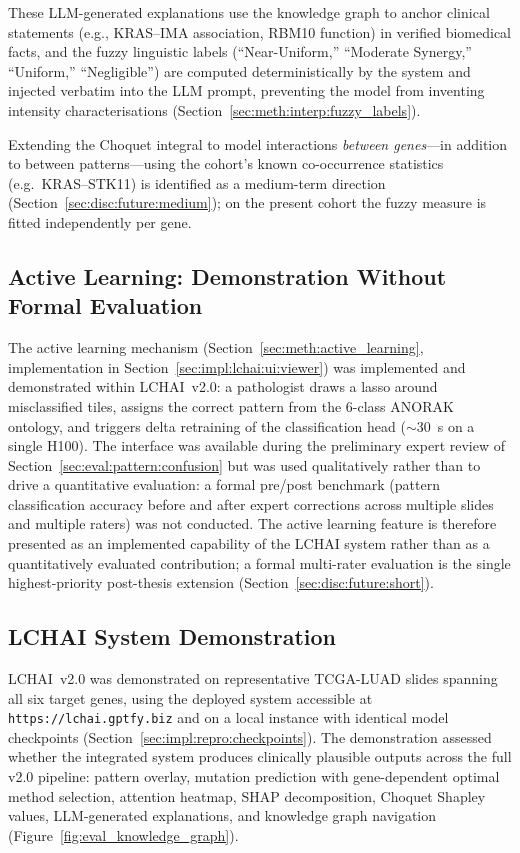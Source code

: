 These LLM-generated explanations use the knowledge graph to anchor
clinical statements (e.g., KRAS--IMA association, RBM10 function)
in verified biomedical facts, and the fuzzy linguistic labels
(``Near-Uniform,'' ``Moderate Synergy,'' ``Uniform,'' ``Negligible'')
are computed deterministically by the system and injected verbatim
into the LLM prompt, preventing the model from inventing intensity
characterisations (Section~\ref{sec:meth:interp:fuzzy_labels}).

Extending the Choquet integral to model interactions \emph{between
genes}---in addition to between patterns---using the cohort's known
co-occurrence statistics (e.g.\ KRAS--STK11) is identified as a
medium-term direction (Section~\ref{sec:disc:future:medium}); on
the present cohort the fuzzy measure is fitted independently per
gene.


\subsection{Active Learning: Demonstration Without Formal Evaluation}
\label{sec:eval:active_learning}

The active learning mechanism
(Section~\ref{sec:meth:active_learning},
implementation in Section~\ref{sec:impl:lchai:ui:viewer}) was
implemented and demonstrated within LCHAI~v2.0: a pathologist draws
a lasso around misclassified tiles, assigns the correct pattern from
the 6-class ANORAK ontology, and triggers delta retraining of the
classification head ($\sim$30~s on a single H100).
The interface was available during the preliminary expert review of
Section~\ref{sec:eval:pattern:confusion} but was used qualitatively
rather than to drive a quantitative evaluation: a formal pre/post
benchmark (pattern classification accuracy before and after expert
corrections across multiple slides and multiple raters) was not
conducted.
The active learning feature is therefore presented as an implemented
capability of the LCHAI system rather than as a quantitatively
evaluated contribution; a formal multi-rater evaluation is the
single highest-priority post-thesis extension
(Section~\ref{sec:disc:future:short}).

\subsection{LCHAI System Demonstration}
\label{sec:eval:lchai}

LCHAI~v2.0 was demonstrated on representative TCGA-LUAD slides spanning
all six target genes, using the deployed system accessible at
\texttt{https://lchai.gptfy.biz} and on a local instance
with identical model checkpoints
(Section~\ref{sec:impl:repro:checkpoints}).
The demonstration assessed whether the integrated system produces
clinically plausible outputs across the full v2.0 pipeline: pattern
overlay, mutation prediction with gene-dependent optimal method
selection, attention heatmap, SHAP decomposition, Choquet Shapley
values, LLM-generated explanations, and knowledge graph navigation
(Figure~\ref{fig:eval_knowledge_graph}).

